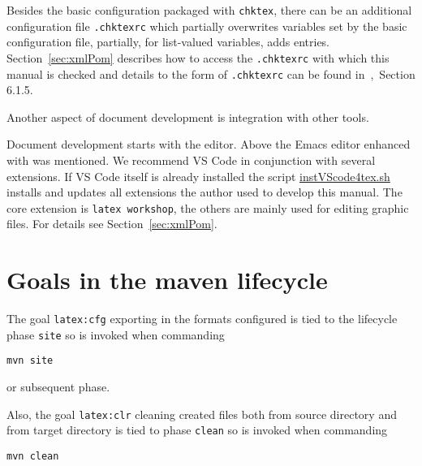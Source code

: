 Besides the basic configuration packaged with \texttt{chktex}, 
there can be an additional configuration file \texttt{.chktexrc} 
which partially overwrites variables set by the basic configuration file, 
partially, for list-valued variables, adds entries. 
Section~\ref{sec:xmlPom} describes how to access the \texttt{.chktexrc} 
with which this manual is checked and 
details to the form of \texttt{.chktexrc} can be found in~\cite{ChkTeX22},~Section 6.1.5.  





Another aspect of document development is integration with other tools. 

Document development starts with the editor. 
Above the Emacs editor enhanced with \auctex{} was mentioned. 
We recommend VS Code in conjunction with several extensions. 
If VS Code itself is already installed 
the script \href{\urlSite fromMain/instVScode4tex}{instVScode4tex.sh} 
installs and updates all extensions 
the author used to develop this manual. 
The core extension is \texttt{latex workshop}, 
the others are mainly used for editing graphic files. 
For details see Section~\ref{sec:xmlPom}. 








\section{Goals in the maven lifecycle}\label{sec:usageLifecycle}

The goal \texttt{latex:cfg} exporting in the formats configured
is tied to the lifecycle phase \texttt{site} so is invoked
when commanding
%
\begin{Verbatim}[fontsize=\scriptsize]
mvn site
\end{Verbatim}
%
or subsequent phase.

Also, the goal \texttt{latex:clr} cleaning created files
both from source directory and from target directory
is tied to phase \texttt{clean} so is invoked
when commanding
%
\begin{Verbatim}[fontsize=\scriptsize]
mvn clean
\end{Verbatim}

